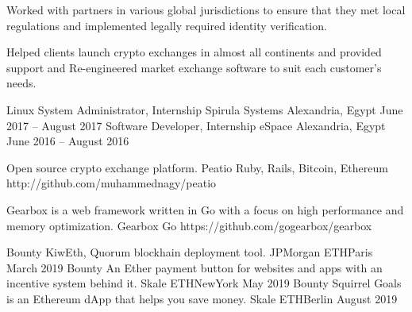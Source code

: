 \documentclass[]{awesome-cv}
\begin{document}
\begin{cventries}
	{\begin{cvitems}
		\item {Worked with partners in various global jurisdictions to ensure that they met local regulations and implemented legally required identity verification.}
		\item {Helped clients launch crypto exchanges in almost all continents and provided support and Re-engineered market exchange software to suit each customer’s needs.}
		\end{cvitems}}
	\cventry
	{Linux System Administrator, Internship}
	{Spirula Systems}
	{Alexandria, Egypt}
	{June 2017 – August 2017}
	{}
	\cventry
	{Software Developer, Internship}
	{eSpace}
	{Alexandria, Egypt}
	{June 2016 – August 2016}
	{}
\end{cventries}

\vspace{-7mm}

\begin{cventries}
	\cventry
	{Open source crypto exchange platform.}
	{Peatio}
	{Ruby, Rails, Bitcoin, Ethereum}
	{http://github.com/muhammednagy/peatio}
	{}
	
	\vspace{-8mm}
	\cventry
	{Gearbox is a web framework written in Go with a focus on high performance and memory optimization.}
	{Gearbox}
	{Go}
	{https://github.com/gogearbox/gearbox}
	{}
	
	\vspace{-7mm}
\end{cventries}

\begin{cvhonors}
	\cvhonor
	{Bounty}
	{KiwEth, Quorum blockhain deployment tool.}
	{JPMorgan ETHParis}
	{March 2019}
	\cvhonor
	{Bounty}
	{An Ether payment button for websites and apps with an incentive system behind it.}
	{Skale ETHNewYork}
	{May 2019}
	\cvhonor
	{Bounty}
	{Squirrel Goals is an Ethereum dApp that helps you save money.}
	{Skale ETHBerlin}
	{August 2019}
\end{cvhonors}
\ 
\end{document}
